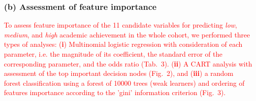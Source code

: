 \documentclass[10pt,letterpaper]{article}
\begin{document}
 \subsubsection*{(b) Assessment of feature importance} 
  \textcolor{red}{To assess feature importance of the 11 candidate variables for predicting {\it low}, {\it medium}, and {\it high} academic achievement in the whole cohort,
 we performed three types of analyses: ({\bf i}) Multinomial logistic regression with consideration of each parameter, i.e. the magnitude of its coefficient, the standard error of the corresponding parameter, and the odds ratio (Tab.~3). 
 ({\bf ii}) A CART analysis with assessment 
 of the top important decision nodes (Fig.~2), and ({\bf iii}) a random forest classification using a forest of 10000 trees (weak learners) and ordering of features importance according
  to the 'gini' information criterion (Fig.~3). }
 


\end{document}
